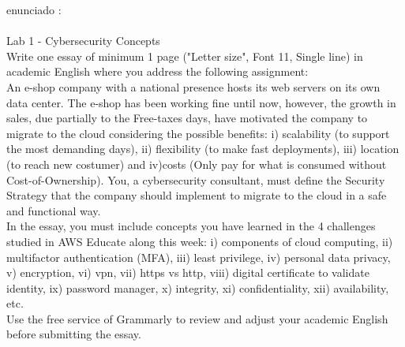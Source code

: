 \documentclass[10pt,a4paper]{article} %
\begin{document}
    \title{\rmfamily\normalfont{}}
    \author{}
    \date{\today} 
    
    \maketitle
     

        enunciado : 
        \\ 
        \\ 
        Lab 1 - Cybersecurity Concepts
        \\
        Write one essay of minimum 1 page ("Letter size", Font 11, Single line) in
        academic English where you address the following assignment:
        \\
        An e-shop company with a national presence hosts its web servers on its own
        data center. The e-shop has been working fine until now, however, the
        growth in sales, due partially to the Free-taxes days, have motivated the
        company to migrate to the cloud considering the possible benefits: i)
        scalability (to support the most demanding days), ii) flexibility (to make
        fast deployments), iii) location (to reach new costumer) and iv)costs (Only
        pay for what is consumed without Cost-of-Ownership). You, a cybersecurity
        consultant, must define the Security Strategy that the company should
        implement to migrate to the cloud in a safe and functional way.
        \\
        In the essay, you must include concepts you have learned in the 4 challenges
        studied in AWS Educate along this week: i) components of cloud computing, ii)
        multifactor authentication (MFA), iii) least privilege, iv) personal data
        privacy, v) encryption, vi) vpn, vii) https vs http, viii) digital certificate
        to validate identity, ix) password manager, x) integrity, xi) confidentiality,
        xii) availability, etc.
        \\
        Use the free service of Grammarly to review and adjust your academic
        English before submitting the essay.
\end{document}
